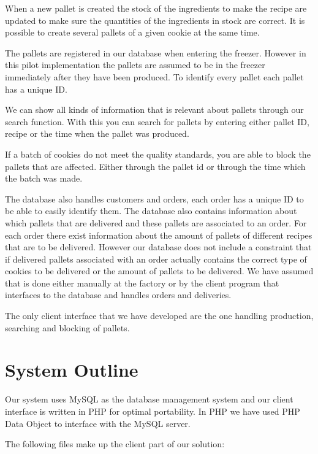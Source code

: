 \documentclass[a4paper]{article}
\begin{document}
When a new pallet is created the stock of the ingredients to make the recipe are updated to make sure the quantities of the ingredients in stock are correct. It is possible to create several pallets of a given cookie at the same time.

The pallets are registered in our database when entering the freezer. However in this pilot implementation the pallets are assumed to be in the freezer immediately after they have been produced. To identify every pallet each pallet has a unique ID.

We can show all kinds of information that is relevant about pallets through our search function. With this you can search for pallets by entering either pallet ID, recipe or the time when the pallet was produced.

If a batch of cookies do not meet the quality standards, you are able to block the pallets that are affected. Either through the pallet id or through the time which the batch was made.

The database also handles customers and orders, each order has a unique ID to be able to easily identify them. The database also contains information about which pallets that are delivered and these pallets are associated to an order. For each order there exist information about the amount of pallets of different recipes that are to be delivered. However our database does not include a constraint that if delivered pallets associated with an order actually contains the correct type of cookies to be delivered or the amount of pallets to be delivered. We have assumed that is done either manually at the factory or by the client program that interfaces to the database and handles orders and deliveries.

The only client interface that we have developed are the one handling production, searching and blocking of pallets.




\section{System Outline}
Our system uses MySQL as the database management system and our client interface is written in PHP for optimal portability. In PHP we have used PHP Data Object to interface with the MySQL server.

The following files make up the client part of our solution:
\end{document}
